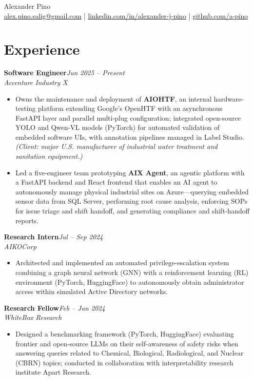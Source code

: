 \documentclass[11pt]{article}
\newcommand{\entry}[4]{%
  \noindent\textbf{#1}\hfill\textit{#2}\\
  \textit{#3}\vspace{-2pt}
  #4
}
\begin{document}
\begin{center}
{\Huge Alexander Pino}\\[4pt]
\href{mailto:alex.pino.salig@gmail.com}{alex.pino.salig@gmail.com} \quad | \quad \href{https://linkedin.com/in/alexander-j-pino}{linkedin.com/in/alexander-j-pino} \quad | \quad \href{https://github.com/a-pino}{github.com/a-pino}
\end{center}

\section*{Experience}

\entry{Software Engineer}{Jun 2025 -- Present}{Accenture Industry X}{
\begin{itemize}
\item Owns the maintenance and deployment of \textbf{AIOHTF}, an internal hardware-testing platform extending Google's OpenHTF with an asynchronous FastAPI layer and parallel multi-plug configuration; integrated open-source YOLO and Qwen-VL models (PyTorch) for automated validation of embedded software UIs, with annotation pipelines managed in Label Studio. \textit{(Client: major U.S. manufacturer of industrial water treatment and sanitation equipment.)}
\item Led a five-engineer team prototyping \textbf{AIX Agent}, an agentic platform with a FastAPI backend and React frontend that enables an AI agent to autonomously manage physical industrial sites on Azure---querying embedded sensor data from SQL Server, performing root cause analysis, enforcing SOPs for issue triage and shift handoff, and generating compliance and shift-handoff reports.
\end{itemize}
}

\entry{Research Intern}{Jul -- Sep 2024}{AIKOCorp}{
\begin{itemize}
\item Architected and implemented an automated privilege-escalation system combining a graph neural network (GNN) with a reinforcement learning (RL) environment (PyTorch, HuggingFace) to autonomously obtain administrator access within simulated Active Directory networks.
\end{itemize}
}

\entry{Research Fellow}{Feb -- Jun 2024}{WhiteBox Research}{
\begin{itemize}
\item Designed a benchmarking framework (PyTorch, HuggingFace) evaluating frontier and open-source LLMs on their self-awareness of safety risks when answering queries related to Chemical, Biological, Radiological, and Nuclear (CBRN) topics; conducted in collaboration with interpretability research institute Apart Research.
\end{itemize}
}
\end{document}
